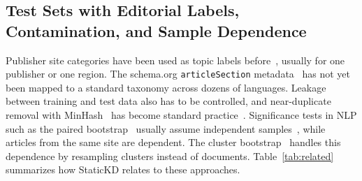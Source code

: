 \subsection{Test Sets with Editorial Labels, Contamination, and Sample Dependence}
Publisher site categories have been used as topic labels before~\cite{mirashi2023indicnews}, usually for one publisher or one region. The schema.org \texttt{articleSection} metadata~\cite{guha2016schema} has not yet been mapped to a standard taxonomy across dozens of languages. Leakage between training and test data also has to be controlled, and near-duplicate removal with MinHash~\cite{broder1997resemblance} has become standard practice~\cite{lee2022dedup}. Significance tests in NLP such as the paired bootstrap~\cite{koehn2004significance} usually assume independent samples~\cite{dror2018hitchhiker}, while articles from the same site are dependent. The cluster bootstrap~\cite{field2007bootstrapping} handles this dependence by resampling clusters instead of documents. Table~\ref{tab:related} summarizes how StaticKD relates to these approaches.

\TabRelated
